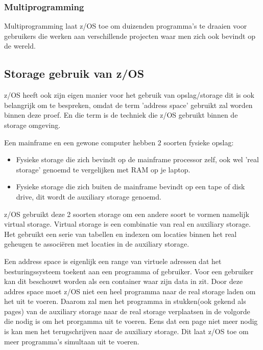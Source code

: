 \subsubsection{Multiprogramming}
\label{subsubsec:Multiprogramming}
Multiprogramming laat z/OS toe om duizenden programma's te draaien voor gebruikers die werken aan verschillende projecten waar men zich ook bevindt op de wereld.

\subsection{Storage gebruik van z/OS}
\label{subsec:Storage gebruik van z/OS}

z/OS heeft ook zijn eigen manier voor het gebruik van opslag/storage dit is ook belangrijk om te bespreken, omdat de term 'address space' gebruikt zal worden binnen deze proef. En die term is de techniek die z/OS gebruikt binnen de storage omgeving.

Een mainframe en een gewone computer hebben 2 soorten fysieke opslag:

\begin{itemize}
	\item Fysieke storage die zich bevindt op de mainframe processor zelf, ook wel 'real storage' genoemd te vergelijken met RAM op je laptop.
	\item Fysieke storage die zich buiten de mainframe bevindt op een tape of disk drive, dit wordt de auxiliary storage genoemd.
\end{itemize}

z/OS gebruikt deze 2 soorten storage om een andere soort te vormen namelijk virtual storage. Virtual storage is een combinatie van real en auxiliary storage. Het gebruikt een serie van tabellen en indexen om locaties binnen het real geheugen te associëren met locaties in de auxiliary storage.

Een address space is eigenlijk een range van virtuele adressen dat het besturingssysteem toekent aan een programma of gebruiker. Voor een gebruiker kan dit beschouwt worden als een container waar zijn data in zit. Door deze addres space moet z/OS niet een heel programma naar de real storage laden om het uit te voeren. Daarom zal men het programma in stukken(ook gekend als pages) van de auxiliary storage naar de real storage verplaatsen in de volgorde die nodig is om het prorgamma uit te voeren. Eens dat een page niet meer nodig is kan men het terugschrijven naar de auxiliary storage. Dit laat z/OS toe om meer programma's simultaan uit te voeren.

